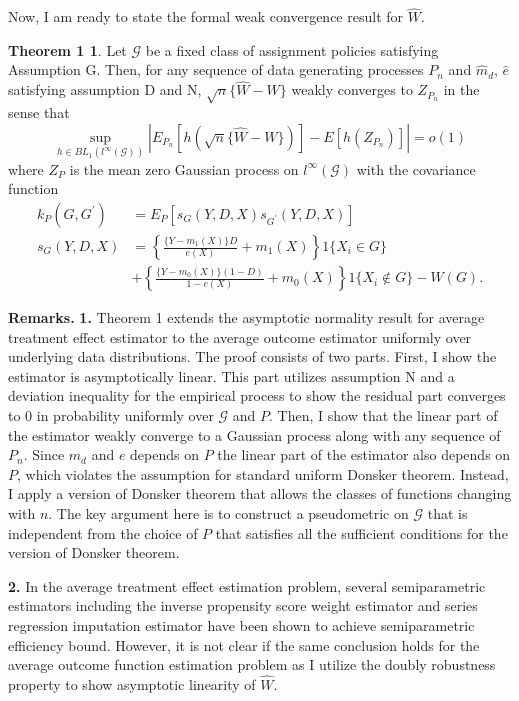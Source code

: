 \documentclass[12pt,oneside,reqno,english]{amsart}
\theoremstyle{definition}
\newtheorem*{thm1}{Theorem 1}
\begin{document}
Now, I am ready to state the formal weak convergence result for $\hat{W}$.
\begin{thm1}
Let $\mathcal{G}$ be a fixed class of assignment policies satisfying Assumption G.  
Then, for any sequence of data generating processes $P_{n}$ and $\hat{m}_{d}$, $\hat{e}$ satisfying assumption D and N, 
$\sqrt{n}\{\hat{W}-W\}$ weakly converges to $Z_{P_{n}}$ in the sense that
\[\sup_{h\in BL_{1}(l^{\infty}(\mathcal{G}))}|E_{P_{n}}[h(\sqrt{n}\{\hat{W}-W\})]-E[h(Z_{P_{n}})]|=o(1)\]
where $Z_{P}$ is the mean zero Gaussian process on $l^{\infty}(\mathcal{G})$ with the covariance function
\begin{align*}
k_{P}(G,G^{\prime})&=E_{P}[s_{G}(Y,D,X)s_{G^{\prime}}(Y,D,X)]\\
s_{G}(Y,D,X)&=\left\{\frac{\{Y-m_{1}(X)\}D}{e(X)}+m_{1}(X)\right\}1\{X_{i}\in G\}\\
&+\left\{\frac{\{Y-m_{0}(X)\}(1-D)}{1-e(X)}+m_{0}(X)\right\}1\{X_{i}\not\in G\}-W(G).
\end{align*}
\end{thm1}
\textbf{Remarks.} 
\textbf{1.} Theorem 1 extends the asymptotic normality result for average treatment effect estimator to the average outcome estimator uniformly over underlying data distributions. The proof consists of two parts. 
First, I show the estimator is asymptotically linear. This part utilizes assumption N and a deviation inequality for the empirical process 
to show the residual part converges to $0$ in probability uniformly over $\mathcal{G}$ and $P$. 
Then, I show that the linear part of the estimator weakly converge to a Gaussian process along with any sequence of $P_{n}$. 
Since $m_{d}$ and $e$ depends on $P$ the linear part of the estimator also depends on $P$, which violates the assumption for standard uniform Donsker theorem.   
Instead, I apply a version of Donsker theorem that allows the classes of functions changing with $n$.
The key argument here is to construct a pseudometric on $\mathcal{G}$ that is independent from the choice of $P$ that satisfies all the sufficient conditions for 
the version of Donsker theorem.  

\textbf{2.} In the average treatment effect estimation problem, several semiparametric estimators  
including the inverse propensity score weight estimator \citep{HIR:03} and series regression imputation estimator \citep{Hahn:98} 
have been shown to achieve semiparametric efficiency bound. However, it is not clear if the same conclusion holds for the average outcome function estimation problem
as I utilize the doubly robustness property to show asymptotic linearity of $\hat{W}$. 
\end{document}
